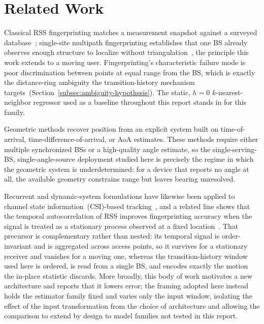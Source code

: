 \section{Related Work}
\label{sec:related-work}

Classical RSS fingerprinting matches a measurement snapshot against a surveyed database~\cite{yang2013_rssitocsi}; single-site multipath fingerprinting establishes that one BS already observes enough structure to localize without triangulation~\cite{kupershtein2013}, the principle this work extends to a moving user. Fingerprinting's characteristic failure mode is poor discrimination between points at equal range from the BS, which is exactly the distance-ring ambiguity the transition-history mechanism targets~(Section~\ref{subsec:ambiguity-hypothesis}). The static, $h=0$ $k$-nearest-neighbor regressor used as a baseline throughout this report stands in for this family. %

Geometric methods recover position from an explicit system built on time-of-arrival, time-difference-of-arrival, or AoA estimates.
These methods require either multiple synchronized BSs or a high-quality angle estimate, so the single-serving-BS, single-angle-source deployment studied here is precisely the regime in which the geometric system is underdetermined: for a device that reports no angle at all, the available geometry constrains range but leaves bearing unresolved.

Recurrent and dynamic-system formulations have likewise been applied to channel state information~(CSI)-based tracking~\cite{fang2010dynamic,yu2020rnn,shi2018tracking}, and a related line shows that the temporal autocorrelation of RSS improves fingerprinting accuracy when the signal is treated as a stationary process observed at a fixed location~\cite{wang2016temporal,tian2018temporal}. That precursor is complementary rather than nested: its temporal signal is order-invariant and is aggregated across access points, so it survives for a stationary receiver and vanishes for a moving one, whereas the transition-history window used here is ordered, is read from a single BS, and encodes exactly the motion the in-place statistic discards. More broadly, this body of work motivates a new architecture and reports that it lowers error; the framing adopted here instead holds the estimator family fixed and varies only the input window, isolating the effect of the input transformation from the choice of architecture and allowing the comparison to extend by design to model families not tested in this report.
